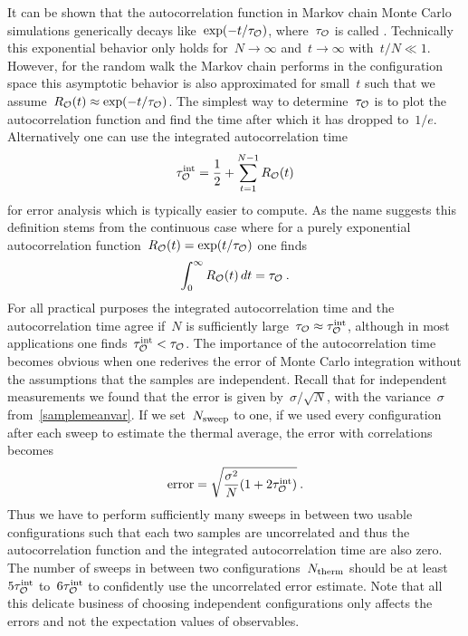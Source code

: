 It can be shown that the autocorrelation function in Markov chain Monte Carlo
simulations generically decays like~$\exp(-t/\tau_{\mathcal{O}})$, where~$\tau_{\mathcal{O}}$ is
called . Technically this exponential behavior
only holds for~$N \to \infty$ and~$t \to \infty$ with~$t/N \ll 1$. However, for
the random walk the Markov chain performs in the configuration space this
asymptotic behavior is also approximated for small~$t$ such that we
assume~$R_{\mathcal{O}}(t) \approx \exp(-t/\tau_{\mathcal{O}})$. The simplest way to
determine~$\tau_{\mathcal{O}}$ is to plot the autocorrelation function and find the time
after which it has dropped to~$1/e$.  Alternatively one can use the integrated
autocorrelation time
%
\begin{equation}\label{tauint}
  \tau^{\mathrm{int}}_{\mathcal{O}} = \frac{1}{2} + \sum_{t=1}^{N-1} R_{\mathcal{O}}(t)
\end{equation}
%
for error analysis which is typically easier to compute. As the name suggests
this definition stems from the continuous case where for a purely exponential
autocorrelation function~$R_{\mathcal{O}}(t) = \exp(t/\tau_{\mathcal{O}})$ one finds
%
\begin{equation}
  \int_0^{\infty} R_{\mathcal{O}}(t) \,dt = \tau_{\mathcal{O}}\:.
\end{equation}
%
For all practical purposes the integrated autocorrelation time and the
autocorrelation time agree if~$N$ is sufficiently large~$\tau_{\mathcal{O}} \approx
\tau^{\mathrm{int}}_{\mathcal{O}}$, although in most applications one finds~$\tau^{\mathrm{int}}_{\mathcal{O}} <
\tau_{\mathcal{O}}$. The importance of the autocorrelation time becomes obvious when one
rederives the error of Monte Carlo integration without the assumptions that the
samples are independent. Recall that for independent measurements we found that
the error is given by~$\sigma/\sqrt{N}$, with the variance~$\sigma$
from~\eqref{samplemeanvar}. If we set~$N_{\mathrm{sweep}}$ to one, \ie{} if we used every
configuration after each sweep to estimate the thermal average, the error with
correlations becomes
%
\begin{equation}\label{correrror}
  \text{error} = \sqrt{\frac{\sigma^2}{N}(1 + 2\tau^{\mathrm{int}}_{\mathcal{O}})}\:.
\end{equation}
%
Thus we have to perform sufficiently many sweeps in between two usable
configurations such that each two samples are uncorrelated and thus the
autocorrelation function and the integrated autocorrelation time are also zero.
The number of sweeps in between two configurations~$N_{\mathrm{therm}}$ should be at
least~$5 \tau^{\mathrm{int}}_{\mathcal{O}}$ to~$6 \tau^{\mathrm{int}}_{\mathcal{O}}$ to confidently use the uncorrelated
error estimate. Note that all this delicate business of choosing independent
configurations only affects the errors and not the expectation values of
observables.

